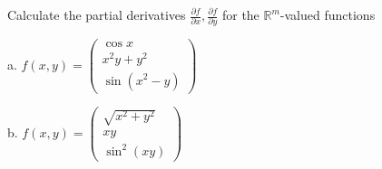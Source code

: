 \begin{exercise}{6}
    Calculate the partial derivatives $\frac{\partial f}{\partial x}, \frac{\partial f}{\partial y}$ for the $\mathbb{R}^m$-valued functions
    
    a. $f(x, y) = \begin{pmatrix} \cos x \\ x^2y + y^2 \\ \sin (x^2 - y) \end{pmatrix}$

    b. $f(x, y) = \begin{pmatrix}
        \sqrt{x^2+y^2} \\ xy \\ \sin^2 (xy)
    \end{pmatrix}$
\end{exercise}

